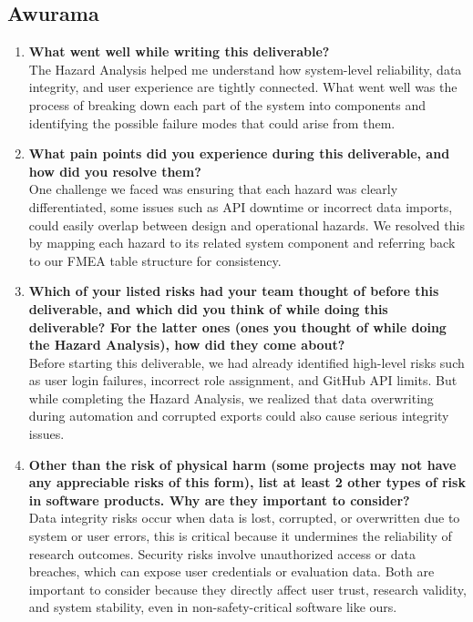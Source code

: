 \documentclass{article}
\begin{document}
\subsection*{Awurama}
\begin{enumerate}
    \item \textbf{What went well while writing this deliverable?}\\
    The Hazard Analysis helped me understand how system-level reliability, data integrity, and user experience are tightly connected. What went well was the process of breaking down each part of the system into components and identifying the possible failure modes that could arise from them.
    \item \textbf{What pain points did you experience during this deliverable, and how
    did you resolve them?}\\
    One challenge we faced was ensuring that each hazard was clearly differentiated, some issues such as API downtime or incorrect data imports, could easily overlap between design and operational hazards. We resolved this by mapping each hazard to its related system component and referring back to our FMEA table structure for consistency.
    \item \textbf{Which of your listed risks had your team thought of before this
    deliverable, and which did you think of while doing this deliverable? For
    the latter ones (ones you thought of while doing the Hazard Analysis), how
    did they come about?}\\
    Before starting this deliverable, we had already identified high-level risks such as user login failures, incorrect role assignment, and GitHub API limits. But while completing the Hazard Analysis, we realized that data overwriting during automation and corrupted exports could also cause serious integrity issues.
    \item \textbf{Other than the risk of physical harm (some projects may not have any
    appreciable risks of this form), list at least 2 other types of risk in
    software products. Why are they important to consider?} \\
    Data integrity risks occur when data is lost, corrupted, or overwritten due to system or user errors, this is critical because it undermines the reliability of research outcomes. Security risks involve unauthorized access or data breaches, which can expose user credentials or evaluation data. Both are important to consider because they directly affect user trust, research validity, and system stability, even in non-safety-critical software like ours.\\
  \end{enumerate}
\end{document}

